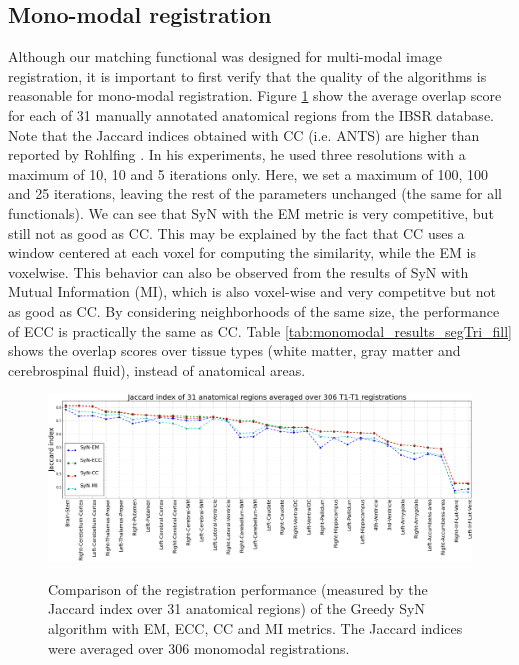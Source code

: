 \subsection{Mono-modal registration}
Although our matching functional was designed for multi-modal image registration, it is important to first verify that the quality of the algorithms is reasonable for mono-modal registration. Figure \ref{fig:mono_graph_seg} show the average overlap score for each of 31 manually annotated anatomical regions from the IBSR database. Note that the Jaccard indices obtained with CC (i.e. ANTS) are higher than reported by Rohlfing \cite{Rohlfing2012}. In his experiments, he used three resolutions with a maximum of 10, 10 and 5 iterations only. Here, we set a maximum of 100, 100 and 25 iterations, leaving the rest of the parameters unchanged (the same for all functionals). We can see that SyN with the EM metric is very competitive, but still not as good as CC. This may be explained by the fact that CC uses a window centered at each voxel for computing the similarity, while the EM is voxelwise. This behavior can also be observed from the results of SyN with Mutual Information (MI), which is also voxel-wise and very competitve but not as good as CC. By considering neighborhoods of the same size, the performance of ECC is practically the same as CC. Table \ref{tab:monomodal_results_segTri_fill} shows the overlap scores over tissue types (white matter, gray matter and cerebrospinal fluid), instead of anatomical areas.
%


\begin{figure}[t!]
\centering
\includegraphics[width=1.0\linewidth]{./images/mono_lines_seg.png}\\
\caption{Comparison of the registration performance (measured by the Jaccard index over 31 anatomical regions) of the Greedy SyN algorithm with EM, ECC, CC and MI metrics. The Jaccard
indices were averaged over 306 monomodal registrations.}
\label{fig:mono_graph_seg}
\end{figure}

